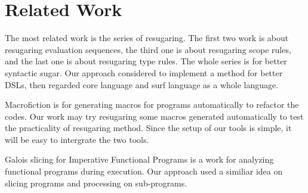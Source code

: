\section{Related Work}


The most related work is the series of resugaring\cite{resugaring,hygienic,resugaringtype,resugaringscope}. The first two work is about resugaring evaluation sequences, the third one is about resugaring scope rules, and the last one is about resugaring type rules. The whole series is for better syntactic sugar. Our approach considered to implement a method for better DSLs, then regarded core language and surf language as a whole language.

Macrofiction\cite{Macrofication} is for generating macros for programs automatically to refactor the codes. Our work may try resugaring some macros generated automatically to test the practicality of resugaring method. Since the setup of our tools is simple, it will be easy to intergrate the two tools.

Galois slicing for Imperative Functional Programs\cite{slicing} is a work for analyzing functional programs during execution. Our approach used a similiar idea on slicing programs and processing on sub-programs.